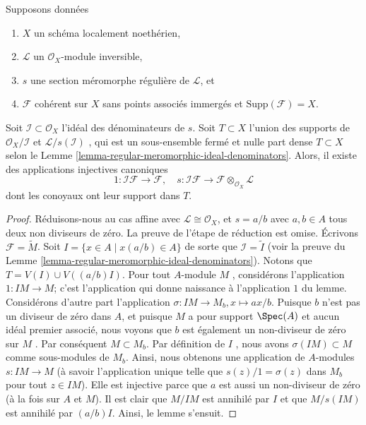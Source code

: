 \begin{lemma}
\label{lemma-make-maps-regular-section}
Supposons données
\begin{enumerate}
\item $X$  un schéma localement noethérien,
\item $\mathcal{L}$  un  $\mathcal{O}_X$-module inversible,
\item $s$  une section méromorphe régulière de  $\mathcal{L}$, et
\item $\mathcal{F}$  cohérent sur  $X$  sans points associés immergés et
 $\text{Supp}(\mathcal{F}) = X$.
\end{enumerate}
Soit  $\mathcal{I} \subset \mathcal{O}_X$  l'idéal des dénominateurs de  $s$. Soit  $T \subset X$ 
l'union des supports de  $\mathcal{O}_X/\mathcal{I}$  et  $\mathcal{L}/s(\mathcal{I})$ , qui est un sous-ensemble
fermé et nulle part dense  $T \subset X$  selon le Lemme  \ref{lemma-regular-meromorphic-ideal-denominators}. Alors, il existe des
applications injectives canoniques
$$
1 : \mathcal{I}\mathcal{F} \to \mathcal{F}, \quad
s : \mathcal{I}\mathcal{F} \to \mathcal{F} \otimes_{\mathcal{O}_X}\mathcal{L}
$$
dont les conoyaux ont leur support dans  $T$.
\end{lemma}

\begin{proof}
Réduisons-nous au cas affine avec  $\mathcal{L} \cong \mathcal{O}_X$, et  $s = a/b$  avec  $a, b \in A$  tous
deux non diviseurs de zéro. La preuve de l'étape de réduction est omise. Écrivons
 $\mathcal{F} = \widetilde{M}$. Soit  $I = \{x \in A \mid x(a/b) \in A\}$  de sorte que  $\mathcal{I} = \widetilde{I}$  (voir la preuve du Lemme
 \ref{lemma-regular-meromorphic-ideal-denominators}). Notons que  $T = V(I) \cup V((a/b)I)$. Pour tout  $A$-module
 $M$ , considérons l'application  $1 : IM \to M$; c'est l'application qui donne
naissance à l'application  $1$  du lemme. Considérons d'autre part l'application
 $\sigma : IM \to M_b, x \mapsto ax/b$. Puisque  $b$  n'est pas un diviseur de zéro dans
 $A$, et puisque  $M$  a pour support  $\Spec(A)$  et aucun idéal
premier associé, nous voyons que  $b$  est également un non-diviseur de
zéro sur  $M$ . Par conséquent  $M \subset M_b$. Par définition de
 $I$ , nous avons  $\sigma(IM) \subset M$  comme sous-modules de  $M_b$. Ainsi,
nous obtenons une application de  $A$-modules  $s : IM \to M$  (à savoir
l'application unique telle que  $s(z)/1 = \sigma(z)$  dans  $M_b$  pour tout
 $z \in IM$). Elle est injective parce que  $a$  est aussi un non-diviseur
de zéro (à la fois sur  $A$  et  $M$). Il est clair que
 $M/IM$  est annihilé par  $I$  et que  $M/s(IM)$  est annihilé par
 $(a/b)I$. Ainsi, le lemme s'ensuit.
\end{proof}





